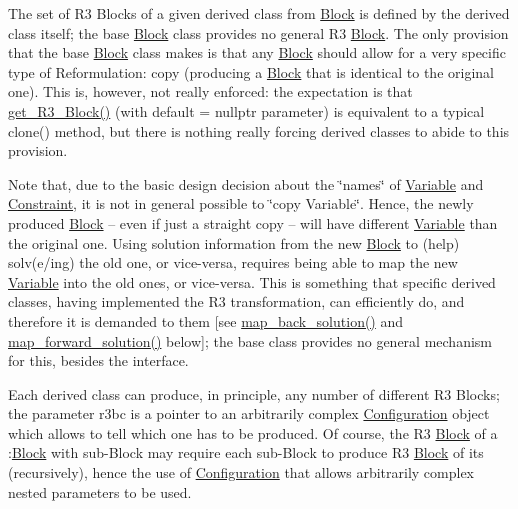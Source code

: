 The set of R3 Blocks of a given derived class from \mbox{\hyperlink{class_s_m_spp__di__unipi__it_1_1_block}{Block}} is defined by the derived class itself; the base \mbox{\hyperlink{class_s_m_spp__di__unipi__it_1_1_block}{Block}} class provides no general R3 \mbox{\hyperlink{class_s_m_spp__di__unipi__it_1_1_block}{Block}}. The only provision that the base \mbox{\hyperlink{class_s_m_spp__di__unipi__it_1_1_block}{Block}} class makes is that any \mbox{\hyperlink{class_s_m_spp__di__unipi__it_1_1_block}{Block}} should allow for a very specific type of Reformulation\+: copy (producing a \mbox{\hyperlink{class_s_m_spp__di__unipi__it_1_1_block}{Block}} that is identical to the original one). This is, however, not really enforced\+: the expectation is that \mbox{\hyperlink{class_s_m_spp__di__unipi__it_1_1_block_a2e682f5c0d4a74503c0cb5ab38fb6428}{get\+\_\+\+R3\+\_\+\+Block()}} (with default = nullptr parameter) is equivalent to a typical clone() method, but there is nothing really forcing derived classes to abide to this provision.

Note that, due to the basic design decision about the \char`\"{}names\char`\"{} of \mbox{\hyperlink{class_s_m_spp__di__unipi__it_1_1_variable}{Variable}} and \mbox{\hyperlink{class_s_m_spp__di__unipi__it_1_1_constraint}{Constraint}}, it is not in general possible to \char`\"{}copy Variable\char`\"{}. Hence, the newly produced \mbox{\hyperlink{class_s_m_spp__di__unipi__it_1_1_block}{Block}} -- even if just a straight copy -- will have different \mbox{\hyperlink{class_s_m_spp__di__unipi__it_1_1_variable}{Variable}} than the original one. Using solution information from the new \mbox{\hyperlink{class_s_m_spp__di__unipi__it_1_1_block}{Block}} to (help) solv(e/ing) the old one, or vice-\/versa, requires being able to map the new \mbox{\hyperlink{class_s_m_spp__di__unipi__it_1_1_variable}{Variable}} into the old ones, or vice-\/versa. This is something that specific derived classes, having implemented the R3 transformation, can efficiently do, and therefore it is demanded to them \mbox{[}see \mbox{\hyperlink{class_s_m_spp__di__unipi__it_1_1_block_a04f0a8a608fcc3ded227c2552f67f1a3}{map\+\_\+back\+\_\+solution()}} and \mbox{\hyperlink{class_s_m_spp__di__unipi__it_1_1_block_a7759467d70613a10c1cdb5d3193b4434}{map\+\_\+forward\+\_\+solution()}} below\mbox{]}; the base class provides no general mechanism for this, besides the interface.

Each derived class can produce, in principle, any number of different R3 Blocks; the parameter r3bc is a pointer to an arbitrarily complex \mbox{\hyperlink{class_s_m_spp__di__unipi__it_1_1_configuration}{Configuration}} object which allows to tell which one has to be produced. Of course, the R3 \mbox{\hyperlink{class_s_m_spp__di__unipi__it_1_1_block}{Block}} of a \+:\mbox{\hyperlink{class_s_m_spp__di__unipi__it_1_1_block}{Block}} with sub-\/\+Block may require each sub-\/\+Block to produce R3 \mbox{\hyperlink{class_s_m_spp__di__unipi__it_1_1_block}{Block}} of its (recursively), hence the use of \mbox{\hyperlink{class_s_m_spp__di__unipi__it_1_1_configuration}{Configuration}} that allows arbitrarily complex nested parameters to be used.

